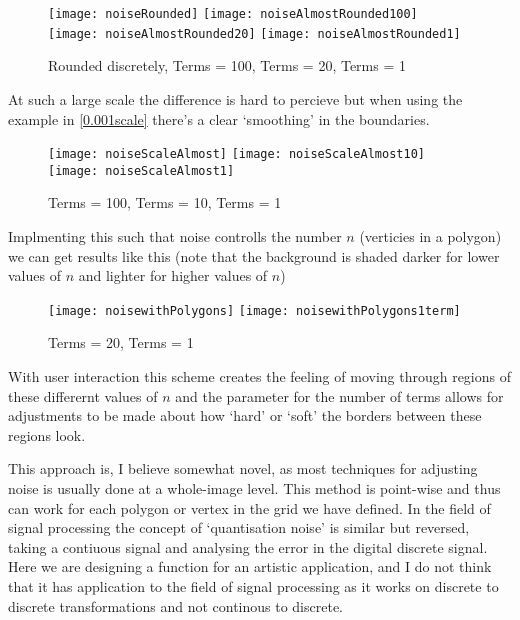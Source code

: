\begin{figure}[H]
\centering
\texttt{[image: noiseRounded]}
\hspace{0.2cm}
\texttt{[image: noiseAlmostRounded100]}
\hspace{0.2cm}
\texttt{[image: noiseAlmostRounded20]}
\hspace{0.2cm}
\texttt{[image: noiseAlmostRounded1]}
\caption{Rounded discretely, Terms = 100, Terms = 20, Terms = 1}
\end{figure}

At such a large scale the difference is hard to percieve but when using the
example in \autoref{0.001scale} there's a clear `smoothing' in the boundaries.

\begin{figure}[H]
\centering
\texttt{[image: noiseScaleAlmost]}
\hspace{0.2cm}
\texttt{[image: noiseScaleAlmost10]}
\hspace{0.2cm}
\texttt{[image: noiseScaleAlmost1]}
\caption{Terms = 100, Terms = 10, Terms = 1}
\end{figure}

Implmenting this such that noise controlls the number $n$ (verticies in a
polygon) we can get results like this (note that the background is shaded darker
for lower values of $n$ and lighter for higher values of $n$)
\begin{figure}[H]
\centering
\texttt{[image: noisewithPolygons]}
\hspace{0.2cm}
\texttt{[image: noisewithPolygons1term]}
\caption{Terms = 20, Terms = 1}
\end{figure}

With user interaction this scheme creates the feeling of moving through regions
of these differernt values of $n$ and the parameter for the number of terms
allows for adjustments to be made about how `hard' or `soft' the borders between
these regions look.

This approach is, I believe somewhat novel, as most techniques for adjusting
noise is usually done at a whole-image level. This method is point-wise and thus
can work for each polygon or vertex in the grid we have defined. In the field of
signal processing the concept of `quantisation noise' is similar but reversed,
taking a contiuous signal and analysing the error in the digital discrete
signal. Here we are designing a function for an artistic application, and I do
not think that it has application to the field of signal processing as it works
on discrete to discrete transformations and not continous to discrete.

